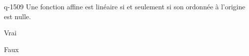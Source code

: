 \begin{truefalse}{q-1509}
Une fonction affine est linéaire si et seulement si son ordonnée à l'origine est nulle.
\item* Vrai
\item Faux
\end{truefalse}

